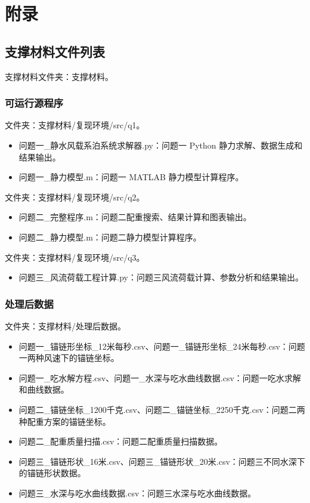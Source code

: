 \section{附录}

\subsection{支撑材料文件列表}

支撑材料文件夹：支撑材料。

\subsubsection{可运行源程序}

文件夹：支撑材料/复现环境/src/q1。

\begin{itemize}
  \item 问题一\_静水风载系泊系统求解器.py：问题一 Python 静力求解、数据生成和结果输出。
  \item 问题一\_静力模型.m：问题一 MATLAB 静力模型计算程序。
\end{itemize}

文件夹：支撑材料/复现环境/src/q2。

\begin{itemize}
  \item 问题二\_完整程序.m：问题二配重搜索、结果计算和图表输出。
  \item 问题二\_静力模型.m：问题二静力模型计算程序。
\end{itemize}

文件夹：支撑材料/复现环境/src/q3。

\begin{itemize}
  \item 问题三\_风流荷载工程计算.py：问题三风流荷载计算、参数分析和结果输出。
\end{itemize}

\subsubsection{处理后数据}

文件夹：支撑材料/处理后数据。

\begin{itemize}
  \item 问题一\_锚链形坐标\_12米每秒.csv、问题一\_锚链形坐标\_24米每秒.csv：问题一两种风速下的锚链坐标。
  \item 问题一\_吃水解方程.csv、问题一\_水深与吃水曲线数据.csv：问题一吃水求解和曲线数据。
  \item 问题二\_锚链坐标\_1200千克.csv、问题二\_锚链坐标\_2250千克.csv：问题二两种配重方案的锚链坐标。
  \item 问题二\_配重质量扫描.csv：问题二配重质量扫描数据。
  \item 问题三\_锚链形状\_16米.csv、问题三\_锚链形状\_20米.csv：问题三不同水深下的锚链形状数据。
  \item 问题三\_水深与吃水曲线数据.csv：问题三水深与吃水曲线数据。
\end{itemize}

